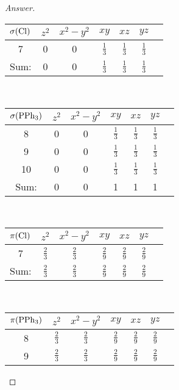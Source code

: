 \documentclass[../psets.tex]{subfiles}
\begin{document}
\begin{enumerate}[label={\Roman*)}]
\begin{enumerate}[label={\textbf{10.\arabic*}}]
\begin{proof}[Answer]
\begin{center}
\begin{tabular}{c|cccccc}
                    $\sigma(\ce{Cl})$ & $z^2$ & $x^2-y^2$ & $xy$ & $xz$ & $yz$\\
                    \hline
                    7 & 0 & 0 & $\frac{1}{3}$ & $\frac{1}{3}$ & $\frac{1}{3}$\\
                    \hline
                    Sum: & 0 & 0 & $\frac{1}{3}$ & $\frac{1}{3}$ & $\frac{1}{3}$\\
                \end{tabular}\\[1em]
                \hspace{-0.4pt}
                \begin{tabular}{c|cccccc}
                    $\sigma(\ce{PPh3})$ & $z^2$ & $x^2-y^2$ & $xy$ & $xz$ & $yz$\\
                    \hline
                    8 & 0 & 0 & $\frac{1}{3}$ & $\frac{1}{3}$ & $\frac{1}{3}$\\
                    9 & 0 & 0 & $\frac{1}{3}$ & $\frac{1}{3}$ & $\frac{1}{3}$\\
                    10 & 0 & 0 & $\frac{1}{3}$ & $\frac{1}{3}$ & $\frac{1}{3}$\\
                    \hline
                    Sum: & 0 & 0 & 1 & 1 & 1\\
                \end{tabular}\\[1em]
                \begin{tabular}{c|cccccc}
                    $\pi(\ce{Cl})$ & $z^2$ & $x^2-y^2$ & $xy$ & $xz$ & $yz$\\
                    \hline
                    7 & $\frac{2}{3}$ & $\frac{2}{3}$ & $\frac{2}{9}$ & $\frac{2}{9}$ & $\frac{2}{9}$\\
                    \hline
                    Sum: & $\frac{2}{3}$ & $\frac{2}{3}$ & $\frac{2}{9}$ & $\frac{2}{9}$ & $\frac{2}{9}$\\
                \end{tabular}\\[1em]
                \hspace{-0.4pt}
                \begin{tabular}{c|cccccc}
                    $\pi(\ce{PPh3})$ & $z^2$ & $x^2-y^2$ & $xy$ & $xz$ & $yz$\\
                    \hline
                    8 & $\frac{2}{3}$ & $\frac{2}{3}$ & $\frac{2}{9}$ & $\frac{2}{9}$ & $\frac{2}{9}$\\
                    9 & $\frac{2}{3}$ & $\frac{2}{3}$ & $\frac{2}{9}$ & $\frac{2}{9}$ & $\frac{2}{9}$\\

\end{tabular}
\end{center}
\end{proof}
\end{enumerate}
\end{enumerate}
\end{document}
